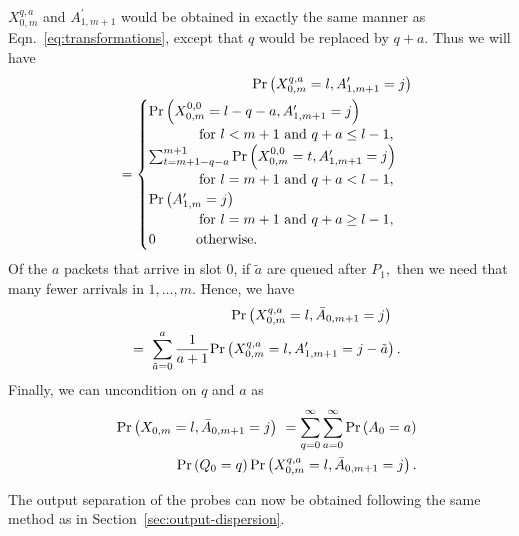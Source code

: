 \documentclass[11pt]{article}
\newcommand{\prob}[1]{\mathsf{\Pr}\left(#1\right)}
\begin{document}
$X^{q,a}_{0,m}$ and $A^\prime_{1,m+1}$ would be obtained in exactly
the same manner as Eqn.~\ref{eq:transformations}, except that $q$
would be replaced by $q+a$.  Thus we will have
\begin{eqnarray}
  && \hspace*{-0.3in}\prob{X_{0,m}^{q,a}=l, A^\prime_{1,m+1}=j}   \nonumber \\
  && = 
  \begin{cases}  
    \prob{X_{0,m}^{0,0}=l-q-a, A^\prime_{1,m+1}=j} \\
    \hspace{0.5in} \mbox{for $l < m+1$ and $q+a \leq l-1,$} \\
    \sum_{t=m+1-q-a}^{m+1} \prob{X_{0,m}^{0,0}=t, A^\prime_{1,m+1} =j}
    \\
    \hspace{0.5in} \mbox{for $l=m+1$ and $q+a < l-1,$}  \\
    \prob{A^\prime_{1,m}=j} \\
    \hspace{0.5in} \mbox{for $l=m+1$ and $q+a \geq l-1,$} \\
    0  \hspace{0.4in} \mbox{otherwise.}
  \end{cases}
  \label{eq:transformations-prime-1}
\end{eqnarray}
Of the $a$ packets that arrive in slot $0$, if $\tilde{a}$ are queued
after $P_1,$ then we need that many fewer arrivals in $1, \ldots, m.$
Hence, we have
\begin{eqnarray}
  && \hspace{-0.4in} \prob{X_{0,m}^{q,a}=l, \bar{A}_{0,m+1}=j} \  \
  \nonumber \\ 
  && = \ \sum_{\tilde{a}=0}^a \frac{1}{a+1} \prob{X_{0,m}^{q,a}=l,
    A^\prime_{1,m+1}=j-\tilde{a} }. 
  \label{eq:transformations-prime-2}  
\end{eqnarray}
Finally, we can uncondition on $q$ and $a$ as
\begin{eqnarray}
  && \prob{X_{0,m}=l, \bar{A}_{0,m+1}=j} \ = \sum_{q=0}^{\infty}
  \sum_{a=0}^\infty  \prob{A_0=a} \nonumber \\
  && \hspace{0.4in} \prob{Q_0=q} \prob{X_{0,m}^{q,a}=l,
    \bar{A}_{0,m+1}=j} . 
  \label{eq:uncondition-on-a}  
\end{eqnarray}

The output separation of the probes can now be obtained following the
same method as in Section~\ref{sec:output-dispersion}.
\end{document}
